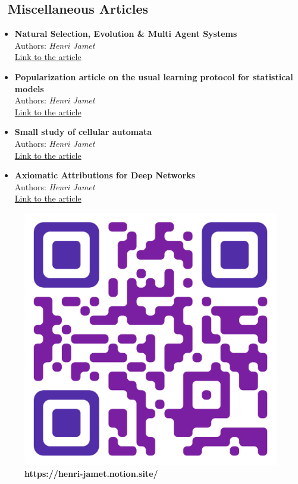 \subsection{\articlesdiversicon~\textcolor{Overleaf_green}{Miscellaneous Articles}}
\begin{itemize}
  \item \textbf{Natural Selection, Evolution \& Multi Agent Systems}\\
  Authors: \textit{Henri Jamet}\\
  \href{https://henri-jamet.notion.site/tude-de-la-S-lection-naturelle-au-moyen-d-une-simulation-multi-agents-88f57904e2a94503a0d91bb99f7d1941}{Link to the article}
  
  \item \textbf{Popularization article on the usual learning protocol for statistical models}\\
  Authors: \textit{Henri Jamet}\\
  \href{https://www.tomcapital.ch/how-does-a-machine-learn-chess-surprisingly-very-much-like-a-human-being/}{Link to the article}
  
  \item \textbf{Small study of cellular automata}\\
  Authors: \textit{Henri Jamet}\\
  \href{https://henri-jamet.notion.site/Small-study-of-cellular-automata-352e858c867e4cf3a960651f33738cb5}{Link to the article}
  
  \item \textbf{Axiomatic Attributions for Deep Networks}\\
  Authors: \textit{Henri Jamet}\\
  \href{https://henri-jamet.notion.site/Henri-Jamet-Portfolio-29160c9443fc4d83b31cdf75dc339b4d?p=146fdf9f541b48738a7c60a2ad669ed8&pm=c}{Link to the article}
\end{itemize}

\begin{figure}[h]
  \centering
  \begin{adjustbox}{max width=0.2\textwidth}
    \includegraphics{Img/QR.png}
  \end{adjustbox}
  \caption{\textbf{https://henri-jamet.notion.site/}}
\end{figure}